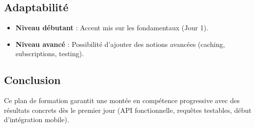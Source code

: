 \documentclass[12pt]{article}
\begin{document}
\subsection*{Adaptabilité}
\begin{itemize}
  \item \textbf{Niveau débutant} : Accent mis sur les fondamentaux (Jour 1).
  \item \textbf{Niveau avancé} : Possibilité d’ajouter des notions avancées (caching, subscriptions, testing).
\end{itemize}

\subsection*{Conclusion}
Ce plan de formation garantit une montée en compétence progressive avec des résultats concrets dès le premier jour (API fonctionnelle, requêtes testables, début d’intégration mobile).
\end{document}
